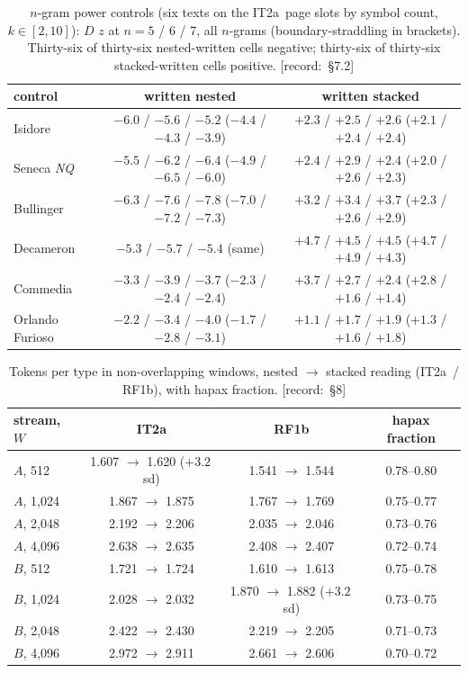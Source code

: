 \documentclass[11pt,a4paper]{article}
\newcommand{\src}[1]{{\footnotesize\color{muted}\sffamily\mbox{[record: \S#1]}}}
\newcommand{\Dstat}{D}
\newcommand{\IT}{\textcolor{it2a}{IT2a}}
\newcommand{\RF}{\textcolor{rf1b}{RF1b}}
\begin{document}
\begin{table}[H]
\centering\small
\caption{$n$-gram power controls (six texts on the \IT\ page slots by symbol count, $k\in[2,10]$): $\Dstat$ $z$ at $n=5$ / 6 / 7, all $n$-grams (boundary-straddling in brackets). Thirty-six of thirty-six nested-written cells negative; thirty-six of thirty-six stacked-written cells positive. \src{7.2}}
\begin{tabular}{@{}lcc@{}}
\toprule
control & written nested & written stacked\\
\midrule
Isidore & $-6.0$ / $-5.6$ / $-5.2$ ($-4.4$ / $-4.3$ / $-3.9$) & $+2.3$ / $+2.5$ / $+2.6$ ($+2.1$ / $+2.4$ / $+2.4$)\\
Seneca \emph{NQ} & $-5.5$ / $-6.2$ / $-6.4$ ($-4.9$ / $-6.5$ / $-6.0$) & $+2.4$ / $+2.9$ / $+2.4$ ($+2.0$ / $+2.6$ / $+2.3$)\\
Bullinger & $-6.3$ / $-7.6$ / $-7.8$ ($-7.0$ / $-7.2$ / $-7.3$) & $+3.2$ / $+3.4$ / $+3.7$ ($+2.3$ / $+2.6$ / $+2.9$)\\
Decameron & $-5.3$ / $-5.7$ / $-5.4$ (same) & $+4.7$ / $+4.5$ / $+4.5$ ($+4.7$ / $+4.9$ / $+4.3$)\\
Commedia & $-3.3$ / $-3.9$ / $-3.7$ ($-2.3$ / $-2.4$ / $-2.4$) & $+3.7$ / $+2.7$ / $+2.4$ ($+2.8$ / $+1.6$ / $+1.4$)\\
Orlando Furioso & $-2.2$ / $-3.4$ / $-4.0$ ($-1.7$ / $-2.8$ / $-3.1$) & $+1.1$ / $+1.7$ / $+1.9$ ($+1.3$ / $+1.6$ / $+1.8$)\\
\bottomrule
\end{tabular}
\end{table}

\begin{table}[H]
\centering\small
\caption{Tokens per type in non-overlapping windows, nested $\to$ stacked reading (\IT\ / \RF), with hapax fraction. \src{8}}
\begin{tabular}{@{}lccc@{}}
\toprule
stream, $W$ & \IT & \RF & hapax fraction\\
\midrule
$A$, 512 & 1.607 $\to$ 1.620 ($+3.2$\,sd) & 1.541 $\to$ 1.544 & 0.78--0.80\\
$A$, 1,024 & 1.867 $\to$ 1.875 & 1.767 $\to$ 1.769 & 0.75--0.77\\
$A$, 2,048 & 2.192 $\to$ 2.206 & 2.035 $\to$ 2.046 & 0.73--0.76\\
$A$, 4,096 & 2.638 $\to$ 2.635 & 2.408 $\to$ 2.407 & 0.72--0.74\\
$B$, 512 & 1.721 $\to$ 1.724 & 1.610 $\to$ 1.613 & 0.75--0.78\\
$B$, 1,024 & 2.028 $\to$ 2.032 & 1.870 $\to$ 1.882 ($+3.2$\,sd) & 0.73--0.75\\
$B$, 2,048 & 2.422 $\to$ 2.430 & 2.219 $\to$ 2.205 & 0.71--0.73\\
$B$, 4,096 & 2.972 $\to$ 2.911 & 2.661 $\to$ 2.606 & 0.70--0.72\\
\bottomrule
\end{tabular}
\end{table}
\end{document}
